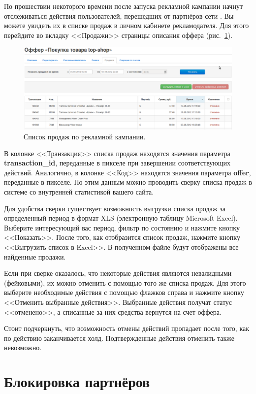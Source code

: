 \documentclass[a4paper,12pt]{article}
\begin{document}
По прошествии некоторого времени после запуска рекламной кампании начнут отслеживаться действия пользователей, перешедших от партнёров сети \heymoose{}. Вы можете увидеть их в списке продаж в личном кабинете рекламодателя. Для этого перейдите во вкладку <<Продажи>> страницы описания оффера (рис.~\ref{fig:sales}).

\begin{figure}[!ht]
\centering
\includegraphics[width=\textwidth]{include/sales.png}
\caption{Список продаж по рекламной кампании.}
\label{fig:sales}
\end{figure}

В колонке <<Транзакция>> списка продаж находятся значения параметра \textbf{transaction\_id}, переданные в пикселе при завершении соответствующих действий. Аналогично, в колонке <<Код>> находятся значения параметра \textbf{offer}, переданные в пикселе. По этим данным можно проводить сверку списка продаж в системе \heymoose{} со внутренней статистикой вашего сайта.

Для удобства сверки существует возможность выгрузки списка продаж за определенный период в формат XLS (электронную таблицу Microsoft Excel). Выберите интересующий вас период, фильтр по состоянию и нажмите кнопку <<Показать>>. После того, как отобразится список продаж, нажмите кнопку <<Выгрузить список в Excel>>. В полученном файле будут отображены все найденные продажи.

Если при сверке оказалось, что некоторые действия являются невалидными (фейковыми), их можно отменить с помощью того же списка продаж. Для этого выберите необходимые действия с помощью флажков справа и нажмите кнопку <<Отменить выбранные действия>>. Выбранные действия получат статус <<отменено>>, а списанные за них средства вернутся на счет оффера.

Стоит подчеркнуть, что возможность отмены действий пропадает после того, как по действию заканчивается холд. Подтвержденные действия отменить также невозможно.

\section{Блокировка партнёров}
\end{document}
